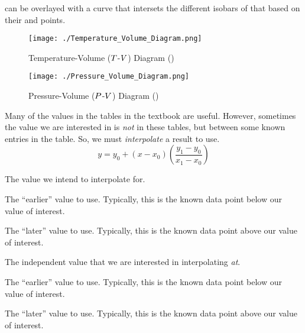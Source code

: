  can be overlayed with a curve that intersets the different isobars of that  based on their  and  points.

\begin{figure}[h!tbp]
  \centering
  \texttt{[image: ./Temperature\_Volume\_Diagram.png]}
  \caption{Temperature-Volume ($T$-$V$) Diagram (\cite[pg. 110]{ThermoTextbook})}
  \label{fig:Temperature_Pressure_Diagram}
\end{figure}

\begin{figure}[h!tbp]
  \centering
  \texttt{[image: ./Pressure\_Volume\_Diagram.png]}
  \caption{Pressure-Volume ($P$-$V$) Diagram (\cite[pg. 110]{ThermoTextbook})}
  \label{fig:Pressure_Volume_Diagram}
\end{figure}

\begin{definition}[Interpolate]\label{def:Interpolate}
  Many of the values in the tables in the textbook are useful.
  However, sometimes the value we are interested in is \textit{not} in these tables, but between some known entries in the table.
  So, we must \emph{interpolate} a result to use.
  \begin{equation}\label{eq:Interpolate}
    y = y_{0} + (x - x_{0}) \left( \frac{y_{1} - y_{0}}{x_{1} - x_{0}} \right)
  \end{equation}
  \begin{description}[noitemsep]
  \item[$y$] The value we intend to interpolate for.
  \item[$y_{0}$] The ``earlier'' value to use.
    Typically, this is the known data point below our value of interest.
  \item[$y_{1}$] The ``later'' value to use.
    Typically, this is the known data point above our value of interest.
  \item[$x$] The independent value that we are interested in interpolating \textit{at}.
  \item[$x_{0}$] The ``earlier'' value to use.
    Typically, this is the known data point below our value of interest.
  \item[$x_{1}$] The ``later'' value to use.
    Typically, this is the known data point above our value of interest.
  \end{description}
\end{definition}

